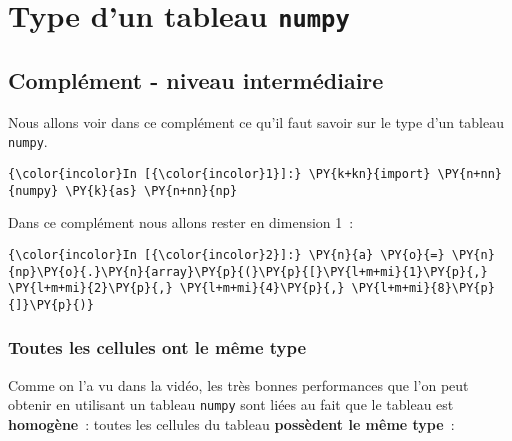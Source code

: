     
    
    
    

    

    \hypertarget{type-dun-tableau-numpy}{%
\section{\texorpdfstring{Type d'un tableau
\texttt{numpy}}{Type d'un tableau numpy}}\label{type-dun-tableau-numpy}}

    \hypertarget{compluxe9ment---niveau-intermuxe9diaire}{%
\subsection{Complément - niveau
intermédiaire}\label{compluxe9ment---niveau-intermuxe9diaire}}

    Nous allons voir dans ce complément ce qu'il faut savoir sur le type
d'un tableau \texttt{numpy}.

    \begin{Verbatim}[commandchars=\\\{\},frame=single,framerule=0.3mm,rulecolor=\color{cellframecolor}]
{\color{incolor}In [{\color{incolor}1}]:} \PY{k+kn}{import} \PY{n+nn}{numpy} \PY{k}{as} \PY{n+nn}{np}
\end{Verbatim}


    Dans ce complément nous allons rester en dimension 1~:

    \begin{Verbatim}[commandchars=\\\{\},frame=single,framerule=0.3mm,rulecolor=\color{cellframecolor}]
{\color{incolor}In [{\color{incolor}2}]:} \PY{n}{a} \PY{o}{=} \PY{n}{np}\PY{o}{.}\PY{n}{array}\PY{p}{(}\PY{p}{[}\PY{l+m+mi}{1}\PY{p}{,} \PY{l+m+mi}{2}\PY{p}{,} \PY{l+m+mi}{4}\PY{p}{,} \PY{l+m+mi}{8}\PY{p}{]}\PY{p}{)}
\end{Verbatim}


    \hypertarget{toutes-les-cellules-ont-le-muxeame-type}{%
\subsubsection{Toutes les cellules ont le même
type}\label{toutes-les-cellules-ont-le-muxeame-type}}

    Comme on l'a vu dans la vidéo, les très bonnes performances que l'on
peut obtenir en utilisant un tableau \texttt{numpy} sont liées au fait
que le tableau est \textbf{homogène}~: toutes les cellules du tableau
\textbf{possèdent le même type}~:

